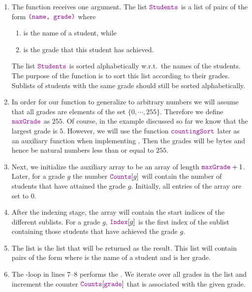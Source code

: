 \begin{enumerate}
\item The function  receives one argument.  The list $\mytt{Students}$
      is a list of pairs of the form $\mytt{(name, grade)}$ where
      \begin{enumerate}
      \item {}  is the name of a student, while
      \item {} is the grade that this student has achieved.
      \end{enumerate}
      The list $\mytt{Students}$ is sorted alphabetically w.r.t.~the names of the students.
      The purpose of the function  is to sort this list according to their grades.
      Sublists of students with the same grade should still be sorted alphabetically.
\item In order for our function to generalize to arbitrary numbers we will assume that all grades are elements
      of the set $\{0,\cdots,255\}$.  Therefore we define $\mytt{maxGrade}$ as $255$.
      Of course, in the example discussed so far we know that the largest
      grade is $5$.  However, we will use the function $\mytt{countingSort}$ later as an auxiliary function
      when implementing .  Then the grades will be bytes and hence be natural numbers less
      than or equal to $255$.
\item Next, we initialize the auxiliary array  to be an array of length $\mytt{maxGrade}+1$.
      Later, for a grade $g$ the number $\mytt{Counts}[g]$ will contain the number of students that have
      attained the grade $g$.  Initially, all entries of the array  are set to $0$.
\item After the indexing stage, the array  will contain the start indices of the different sublists.
      For a grade $g$, $\mytt{Index}[g]$ is the first index of the sublist containing those students that
      have achieved the grade $g$.
\item The list  is the list that will be returned as the result.
      This list will contain pairs of the form  where  is the name of a student
      and  is her grade.
\item The -loop in lines 7--8 performs the .  We iterate over all grades
      in the list  and increment the counter $\mytt{Counts}[\mytt{grade}]$ that is associated with the given grade.

\end{enumerate}
